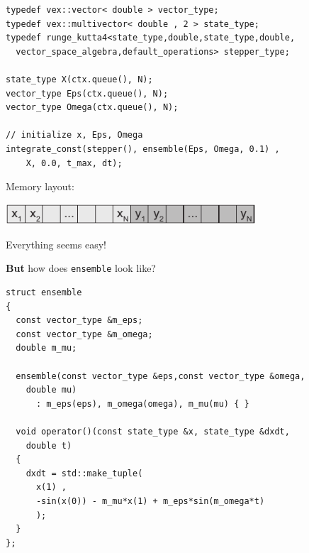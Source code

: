 \begin{frame}[fragile]


 \begin{lstlisting}[basicstyle=\scriptsize\ttfamily]
typedef vex::vector< double > vector_type;
typedef vex::multivector< double , 2 > state_type;
typedef runge_kutta4<state_type,double,state_type,double,
  vector_space_algebra,default_operations> stepper_type;

state_type X(ctx.queue(), N);
vector_type Eps(ctx.queue(), N);
vector_type Omega(ctx.queue(), N);

// initialize x, Eps, Omega
integrate_const(stepper(), ensemble(Eps, Omega, 0.1) ,
    X, 0.0, t_max, dt);
 \end{lstlisting}

\vspace{2ex}

\centerline{Memory layout:}

\vspace{1ex}

\centerline{\includegraphics[draft=false,width=0.7\textwidth]{memory_layout2.pdf}}

\vspace{2ex}

\centerline{Everything seems easy!}
\vspace{2ex}
\centerline{{\bf But} how does {\tt ensemble} look like?}
 

\end{frame}






\begin{frame}[fragile]


 \begin{lstlisting}[basicstyle=\scriptsize\ttfamily]
struct ensemble
{
  const vector_type &m_eps;
  const vector_type &m_omega;
  double m_mu;

  ensemble(const vector_type &eps,const vector_type &omega,
    double mu)
      : m_eps(eps), m_omega(omega), m_mu(mu) { }

  void operator()(const state_type &x, state_type &dxdt,
    double t)
  {
    dxdt = std::make_tuple(
      x(1) ,
      -sin(x(0)) - m_mu*x(1) + m_eps*sin(m_omega*t)
      );
  }
};
 \end{lstlisting}


\end{frame}




